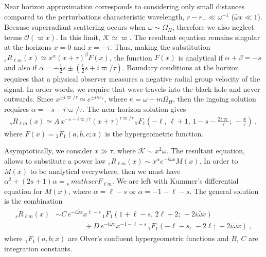 Near horizon approximation corresponds to considering only small distances compared to the perturbations characteristic wavelength, $r-r_{+} \ll \omega^{-1}$ ($\bar{\omega} x \ll 1$).
Because superradiant scattering occurs when $\omega\sim\Omega_H$, therefore we also neglect terms $\mathscr{O}(\varpi x)$.
In this limit, $\mathscr{K}\simeq\varpi$.
The resultant equation remains singular at the horizons $x=0$ and $x=-\tau$. Thus, making the substitution ${}_{s}R_{\ell m}(x)\simeq x^\alpha (x+\tau)^\beta F(x)$, the function $F(x)$ is analytical if $\alpha+\beta=-s$ and also if $\alpha=-\tfrac{1}{2} s \pm \left(\tfrac{1}{2} s + i \varpi/\tau \right)$.
Boundary conditions at the horizon requires that a physical observer measures a negative radial group velocity of the signal.
In order words, we require that wave travels into the black hole and never outwards.
Since $x^{\pm i \varpi/\tau} \simeq e^{\pm i \kappa r_{*}}$, where $\kappa=\omega - m \Omega_H$, then the ingoing solution requires $\alpha=-s-i\varpi/\tau$. The near horizon solution gives
\begin{align}
    \label{eq3:RnearSolution}
    {}_{s}R_{\ell m}(x) \simeq A \, x^{-s-i\varpi/\tau} (x+\tau)^{i\varpi/\tau} \,{}_{2}F_1\left( -\ell, \,\ell+1, \,1-s-\frac{2i\varpi}{\tau}; \,-\frac{x}{\tau}\right) ~,
\end{align}
where $F(x)={}_{2}F_1(a,b,c; x)$ is the hypergeometric function.

Asymptotically, we consider $x\gg\tau$, where $\mathscr{K}\sim x^2 \bar{\omega}$. The resultant equation, 
allows to substitute a power law ${}_{s}R_{\ell m}(x)\sim x^\alpha e^{- i \bar{\omega} x} M(x)$. In order to $M(x)$ to be analytical everywhere, then we must have $\alpha^2+(2s+1)\alpha = {}_{s}\ mathscr{F}_{\ell m}$. We are left with Kummer's differential equation for $M(x)$, where $\alpha = \ell-s$ or $\alpha=-1-\ell-s$. The general solution is the combination
\begin{align}
    \begin{split}
    {}_{s}R_{\ell m}(x) &\sim   C\,  e^{-i \bar{\omega} x} x^{\ell-s} \, {}_{1}F_1(1+\ell-s, \,2 \ell+2 ; \,-2 i \bar{\omega} x) \\
    &\qquad\qquad + D\,  e^{-i \bar{\omega} x} x^{-1-\ell-s} \, {}_{1}F_1(-\ell-s, \,-2 \ell; \,-2 i \bar{\omega} x) ~,
    \end{split}
    \label{eq3:RfarSolution}
\end{align}
where ${}_{1}F_1(a,b;x)$ are Olver's confluent hypergeometric functions and $B$, $C$ are integration constants.

